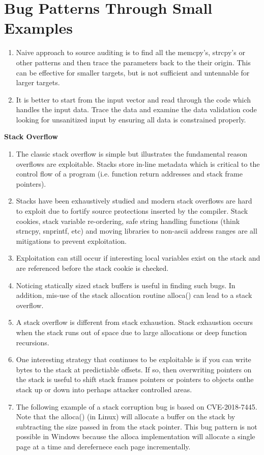 \documentclass[12pt]{Training}
\begin{document}
\section*{Bug Patterns Through Small Examples}
\begin{enumerate}
	\item Naive approach to source auditing is to find all the memcpy's, strcpy's or other patterns and then trace the parameters back to the their origin. This can be effective for smaller targets, but is not sufficient and untennable for larger targets.
	\item It is better to start from the input vector and read through the code which handles the input data. Trace the data and examine the data validation code looking for unsanitized input by ensuring all data is constrained properly.
\end{enumerate}

\textbf{Stack Overflow}
\begin{enumerate}
	\item The classic stack overflow is simple but illustrates the fundamental reason overflows are exploitable. Stacks store in-line metadata which is critical to the control flow of a program (i.e. function return addresses and stack frame pointers).
	\item Stacks have been exhaustively studied and modern stack overflows are hard to exploit due to fortify source protections inserted by the compiler. Stack cookies, stack variable re-ordering, safe string handling functions (think strncpy, snprintf, etc) and moving libraries to non-ascii address ranges are all mitigations to prevent exploitation.
	\item Exploitation can still occur if interesting local variables exist on the stack and are referenced before the stack cookie is checked.
	\item Noticing statically sized stack buffers is useful in finding such bugs. In addition, mis-use of the stack allocation routine alloca() can lead to a stack overflow.
	\item A stack overflow is different from stack exhaustion. Stack exhaustion occurs when the stack runs out of space due to large allocations or deep function recursions.
	\item One interesting strategy that continues to be exploitable is if you can write bytes to the stack at predictiable offsets. If so, then overwriting pointers on the stack is useful to shift stack frames pointers or pointers to objects onthe stack up or down into perhaps attacker controlled areas.
	\item The following example of a stack corruption bug is based on CVE-2018-7445. Note that the alloca() (in Linux) will allocate a buffer on the stack by subtracting the size passed in from the stack pointer. This bug pattern is not possible in Windows because the alloca implementation will allocate a single page at a time and derefernece each page incrementally.
\end{enumerate}
\end{document}
